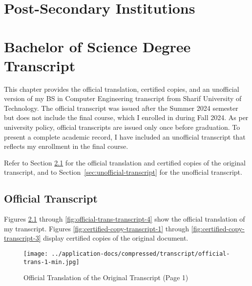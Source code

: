 
\chapter{Post-Secondary Institutions}\label{sec:post-secondary-institutions}

\chapter{Bachelor of Science Degree Transcript}\label{sec:transcript}

This chapter provides the official translation, certified copies, and an unofficial version of my BS in Computer Engineering transcript from Sharif University of Technology. The official transcript was issued after the Summer 2024 semester but does not include the final course, which I enrolled in during Fall 2024. As per university policy, official transcripts are issued only once before graduation. To present a complete academic record, I have included an unofficial transcript that reflects my enrollment in the final course.

Refer to Section \ref{sec:official-transcript} for the official translation and certified copies of the original transcript, and to Section~\ref{sec:unofficial-transcript} for the unofficial transcript.

\clearpage

\section{Official Transcript}\label{sec:official-transcript}

Figures \ref{fig:official-trans-transcript-1} through \ref{fig:official-trans-transcript-4} show the official translation of my transcript. Figures \ref{fig:certified-copy-transcript-1} through \ref{fig:certified-copy-transcript-3} display certified copies of the original document.

\vspace*{\fill}
\begin{figure}[H]
    \centering
    \texttt{[image: ../application-docs/compressed/transcript/official-trans-1-min.jpg]}
    \caption{Official Translation of the Original Transcript (Page 1)}
    \label{fig:official-trans-transcript-1}
\end{figure}
\vspace*{\fill}

\clearpage

